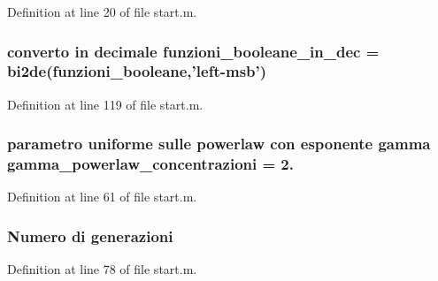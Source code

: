 Definition at line 20 of file start.\-m.

\hypertarget{a00065_af44cf9f59bd0c10b4d2aa541bd7c156b}{
\subsubsection[{funzioni\-\_\-booleane\-\_\-in\-\_\-dec}]{\setlength{\rightskip}{0pt plus 5cm}converto in decimale funzioni\-\_\-booleane\-\_\-in\-\_\-dec = bi2de(funzioni\-\_\-booleane,'left-\/msb')}}\label{a00065_af44cf9f59bd0c10b4d2aa541bd7c156b}


Definition at line 119 of file start.\-m.

\hypertarget{a00065_a7cd0915d7542523abc226a8eecf67ecf}{
\subsubsection[{gamma\-\_\-powerlaw\-\_\-concentrazioni}]{\setlength{\rightskip}{0pt plus 5cm}parametro uniforme sulle powerlaw con esponente gamma gamma\-\_\-powerlaw\-\_\-concentrazioni = 2.}}\label{a00065_a7cd0915d7542523abc226a8eecf67ecf}


Definition at line 61 of file start.\-m.

\hypertarget{a00065_a5951b3462407a0e7e2e60534f76f5fec}{
\subsubsection[{generazioni}]{\setlength{\rightskip}{0pt plus 5cm}Numero di generazioni}}\label{a00065_a5951b3462407a0e7e2e60534f76f5fec}


Definition at line 78 of file start.\-m.

